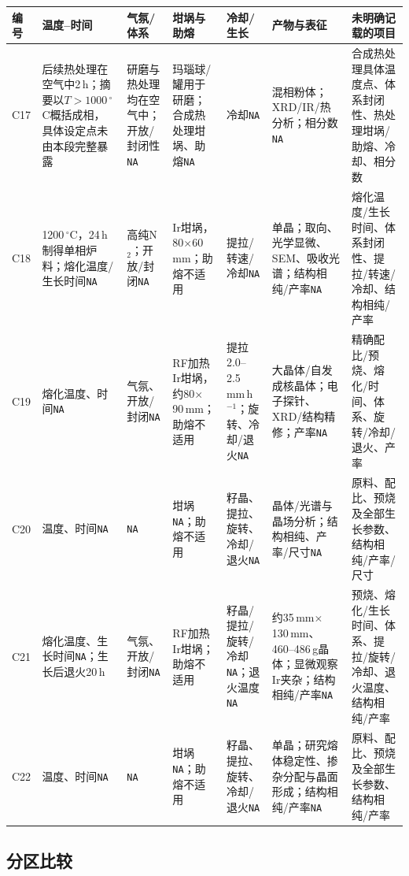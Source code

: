 \begin{table}[p]
\vspace{4pt}
\begin{tabular}{P{0.045\textwidth}P{0.15\textwidth}P{0.12\textwidth}P{0.17\textwidth}P{0.15\textwidth}P{0.17\textwidth}P{0.14\textwidth}}
\toprule
编号 & 温度--时间 & 气氛/体系 & 坩埚与助熔 & 冷却/生长 & 产物与表征 & 未明确记载的项目\\
\midrule
C17 & 后续热处理在空气中2\,h；摘要以$T>1000\,{}^\circ$C概括成相，具体设定点未由本段完整暴露 & 研磨与热处理均在空气中；开放/封闭性\texttt{NA} & 玛瑙球/罐用于研磨；合成热处理坩埚、助熔\texttt{NA} & 冷却\texttt{NA} & 混相粉体；XRD/IR/热分析；相分数\texttt{NA} & 合成热处理具体温度点、体系封闭性、热处理坩埚/助熔、冷却、相分数\\
C18 & 1200\,$^\circ$C，24\,h制得单相炉料；熔化温度/生长时间\texttt{NA} & 高纯N$_2$；开放/封闭\texttt{NA} & Ir坩埚，80$\times$60\,mm；助熔不适用 & 提拉/转速/冷却\texttt{NA} & 单晶；取向、光学显微、SEM、吸收光谱；结构相纯/产率\texttt{NA} & 熔化温度/生长时间、体系封闭性、提拉/转速/冷却、结构相纯/产率\\
C19 & 熔化温度、时间\texttt{NA} & 气氛、开放/封闭\texttt{NA} & RF加热Ir坩埚，约80$\times$90\,mm；助熔不适用 & 提拉2.0--2.5\,mm\,h$^{-1}$；旋转、冷却/退火\texttt{NA} & 大晶体/自发成核晶体；电子探针、XRD/结构精修；产率\texttt{NA} & 精确配比/预烧、熔化/时间、体系、旋转/冷却/退火、产率\\
C20 & 温度、时间\texttt{NA} & \texttt{NA} & 坩埚\texttt{NA}；助熔不适用 & 籽晶、提拉、旋转、冷却/退火\texttt{NA} & 晶体/光谱与晶场分析；结构相纯、产率/尺寸\texttt{NA} & 原料、配比、预烧及全部生长参数、结构相纯/产率/尺寸\\
C21 & 熔化温度、生长时间\texttt{NA}；生长后退火20\,h & 气氛、开放/封闭\texttt{NA} & RF加热Ir坩埚；助熔不适用 & 籽晶/提拉/旋转/冷却\texttt{NA}；退火温度\texttt{NA} & 约35\,mm$\times$130\,mm、460--486\,g晶体；显微观察Ir夹杂；结构相纯/产率\texttt{NA} & 预烧、熔化/生长时间、体系、提拉/旋转/冷却、退火温度、结构相纯/产率\\
C22 & 温度、时间\texttt{NA} & \texttt{NA} & 坩埚\texttt{NA}；助熔不适用 & 籽晶、提拉、旋转、冷却/退火\texttt{NA} & 单晶；研究熔体稳定性、掺杂分配与晶面形成；结构相纯/产率\texttt{NA} & 原料、配比、预烧及全部生长参数、结构相纯/产率\\
\bottomrule
\end{tabular}
\end{table}

\subsection{分区比较}

